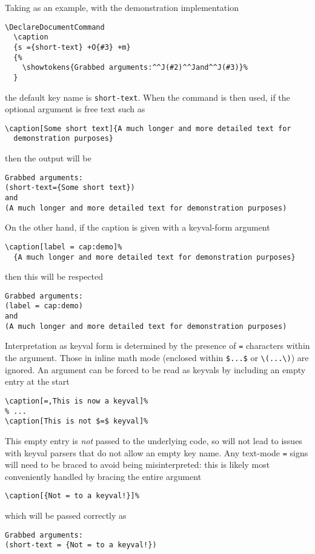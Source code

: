 \documentclass{ltxguide}
\begin{document}
Taking  as an example, with the demonstration implementation
\begin{verbatim}
\DeclareDocumentCommand
  \caption
  {s ={short-text} +O{#3} +m}
  {%
    \showtokens{Grabbed arguments:^^J(#2)^^Jand^^J(#3)}%
  }
\end{verbatim}
the default key name is \texttt{short-text}. When the command  is
then used, if the optional argument is free text such as
\begin{verbatim}
\caption[Some short text]{A much longer and more detailed text for
  demonstration purposes}
\end{verbatim}
then the output will be
\begin{verbatim}
Grabbed arguments:
(short-text={Some short text})
and
(A much longer and more detailed text for demonstration purposes)
\end{verbatim}
On the other hand, if the caption is given with a keyval-form argument
\begin{verbatim}
\caption[label = cap:demo]%
  {A much longer and more detailed text for demonstration purposes}
\end{verbatim}
then this will be respected
\begin{verbatim}
Grabbed arguments:
(label = cap:demo)
and
(A much longer and more detailed text for demonstration purposes)
\end{verbatim}

Interpretation as keyval form is determined by the presence of \texttt{=}
characters within the argument. Those in inline math mode (enclosed within
\verb|$...$| or \verb|\(...\)|) are ignored. An argument can be forced to be
read as keyvals by including an empty entry at the start
\begin{verbatim}
\caption[=,This is now a keyval]%
% ...
\caption[This is not $=$ keyval]%
\end{verbatim}

This empty entry is \emph{not} passed to the underlying code, so will not lead
to issues with keyval parsers that do not allow an empty key name. Any text-mode
\texttt{=} signs will need to be braced to avoid being misinterpreted: this
is likely most conveniently handled by bracing the entire argument
\begin{verbatim}
\caption[{Not = to a keyval!}]%
\end{verbatim}
which will be passed correctly as
\begin{verbatim}
Grabbed arguments:
(short-text = {Not = to a keyval!})
\end{verbatim}
\end{document}
